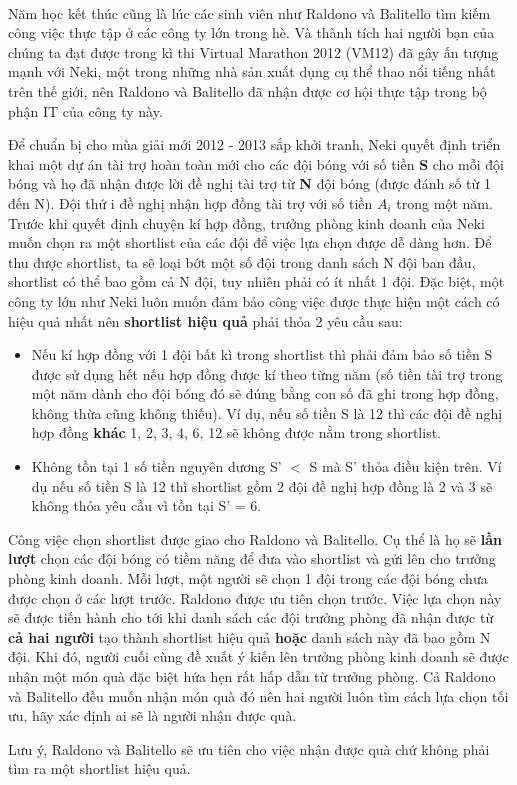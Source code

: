  

Năm học kết thúc cũng là lúc các sinh viên như Raldono và Balitello tìm kiếm công việc thực tập ở các công ty lớn trong hè. Và thành tích hai người bạn của chúng ta đạt được trong kì thi Virtual Marathon 2012 (VM12) đã gây ấn tượng mạnh với Neki, một trong những nhà sản xuất dụng cụ thể thao nổi tiếng nhất trên thế giới, nên Raldono và Balitello đã nhận được cơ hội thực tập trong bộ phận IT của công ty này.

Để chuẩn bị cho mùa giải mới 2012 - 2013 sắp khởi tranh, Neki quyết định triển khai một dự án tài trợ hoàn toàn mới cho các đội bóng với số tiền \textbf{ S } cho mỗi đội bóng và họ đã nhận được lời đề nghị tài trợ từ \textbf{ N } đội bóng (được đánh số từ 1 đến N). Đội thứ i đề nghị nhận hợp đồng tài trợ với số tiền \textbf{ $A_{i}$} trong một năm. Trước khi quyết định chuyện kí hợp đồng, trưởng phòng kinh doanh của Neki muốn chọn ra một shortlist của các đội để việc lựa chọn được dễ dàng hơn. Để thu được shortlist, ta sẽ loại bớt một số đội trong danh sách N đội ban đầu, shortlist có thể bao gồm cả N đội, tuy nhiên phải có ít nhất 1 đội. Đặc biệt, một công ty lớn như Neki luôn muốn đảm bảo công việc được thực hiện một cách có hiệu quả nhất nên \textbf{ shortlist hiệu quả } phải thỏa 2 yêu cầu sau:
\begin{itemize}
	\item Nếu kí hợp đồng với 1 đội bất kì trong shortlist thì phải đảm bảo số tiền S được sử dụng hết nếu hợp đồng được kí theo từng năm (số tiền tài trợ trong một năm dành cho đội bóng đó sẽ đúng bằng con số đã ghi trong hợp đồng, không thừa cũng không thiếu). Ví dụ, nếu số tiền S là 12 thì các đội đề nghị hợp đồng \textbf{ khác } 1, 2, 3, 4, 6, 12 sẽ không được nằm trong shortlist.
\end{itemize}
\begin{itemize}
	\item Không tồn tại 1 số tiền nguyên dương S' $<$ S mà S' thỏa điều kiện trên. Ví dụ nếu số tiền S là 12 thì shortlist gồm 2 đội đề nghị hợp đồng là 2 và 3 sẽ không thỏa yêu cầu vì tồn tại S' = 6.
\end{itemize}

Công việc chọn shortlist được giao cho Raldono và Balitello. Cụ thể là họ sẽ \textbf{ lần lượt } chọn các đội bóng có tiềm năng để đưa vào shortlist và gửi lên cho trưởng phòng kinh doanh. Mỗi lượt, một người sẽ chọn 1 đội trong các đội bóng chưa được chọn ở các lượt trước. Raldono được ưu tiên chọn trước. Việc lựa chọn này sẽ được tiến hành cho tới khi danh sách các đội trưởng phòng đã nhận được từ \textbf{ cả hai người } tạo thành shortlist hiệu quả \textbf{ hoặc } danh sách này đã bao gồm N đội. Khi đó, người cuối cùng đề xuất ý kiến lên trưởng phòng kinh doanh sẽ được nhận một món quà đặc biệt hứa hẹn rất hấp dẫn từ trưởng phòng. Cả Raldono và Balitello đều muốn nhận món quà đó nên hai người luôn tìm cách lựa chọn tối ưu, hãy xác định ai sẽ là người nhận được quà.

Lưu ý, Raldono và Balitello sẽ ưu tiên cho việc nhận được quà chứ không phải tìm ra một shortlist hiệu quả.